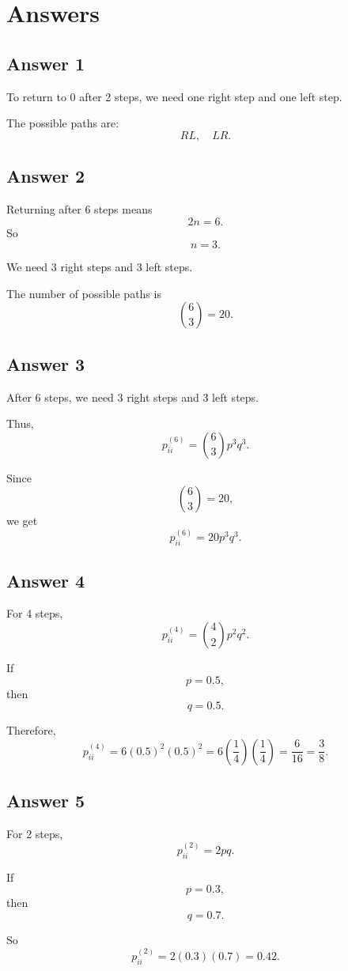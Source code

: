 \documentclass[12pt,a4paper]{article}
\theoremstyle{notestyle}
\begin{document}
\section{Answers}

\subsection*{Answer 1}

To return to 0 after 2 steps, we need one right step and one left step.

The possible paths are:
\[
RL,\quad LR.
\]

\subsection*{Answer 2}

Returning after 6 steps means
\[
2n=6.
\]
So
\[
n=3.
\]

We need 3 right steps and 3 left steps.

The number of possible paths is
\[
\binom{6}{3}=20.
\]

\subsection*{Answer 3}

After 6 steps, we need 3 right steps and 3 left steps.

Thus,
\[
p_{ii}^{(6)}
=
\binom{6}{3}p^3q^3.
\]

Since
\[
\binom{6}{3}=20,
\]
we get
\[
p_{ii}^{(6)}=20p^3q^3.
\]

\subsection*{Answer 4}

For 4 steps,
\[
p_{ii}^{(4)}=\binom{4}{2}p^2q^2.
\]

If
\[
p=0.5,
\]
then
\[
q=0.5.
\]

Therefore,
\[
p_{ii}^{(4)}
=
6(0.5)^2(0.5)^2
=
6\left(\frac14\right)\left(\frac14\right)
=
\frac{6}{16}
=
\frac38.
\]

\subsection*{Answer 5}

For 2 steps,
\[
p_{ii}^{(2)}=2pq.
\]

If
\[
p=0.3,
\]
then
\[
q=0.7.
\]

So
\[
p_{ii}^{(2)}
=
2(0.3)(0.7)
=
0.42.
\]
\end{document}
